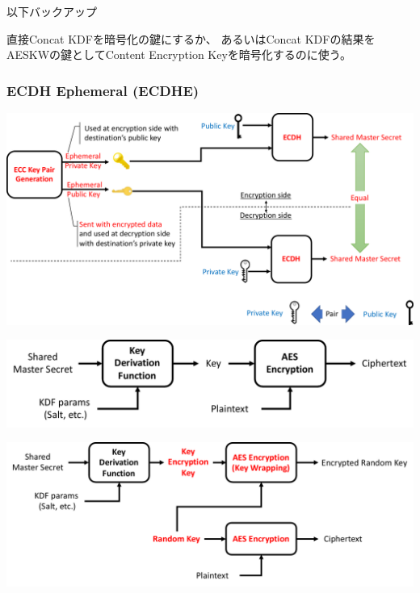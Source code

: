 \documentclass[12pt,dvipdfmx]{beamer}
\newcommand{\backupend}{
   \addtocounter{framenumberappendix}{-\value{framenumber}}
   \addtocounter{framenumber}{\value{framenumberappendix}} 
}
\begin{document}
\begin{frame}
 以下バックアップ
\end{frame}
\begin{frame}
直接Concat KDFを暗号化の鍵にするか、
あるいはConcat KDFの結果をAESKWの鍵としてContent Encryption Keyを暗号化するのに使う。

\end{frame}

\begin{frame}
\frametitle{ECDH Ephemeral (ECDHE)}
\begin{center}
\includegraphics[width=\linewidth]{Figs/ecdh01.pdf}
\end{center}
\end{frame}

\begin{frame}
\begin{center}
\includegraphics[width=\linewidth]{Figs/ecdh02.pdf}
\end{center}
\end{frame}


\begin{frame}
\begin{center}
\includegraphics[width=\linewidth]{Figs/aeskw.pdf}
\end{center}
\end{frame}





 

\backupend
\end{document}
